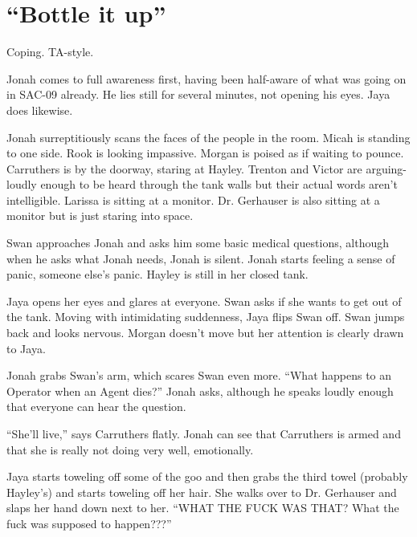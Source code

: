 \setcounter{chapter}{ 25 }
\chapter{\textbf{``Bottle it up''} }








Coping.  TA-style.




Jonah comes to full awareness first, having been half-aware of what was going on in SAC-09 already.  He lies still for several minutes, not opening his eyes.  Jaya does likewise.



Jonah surreptitiously scans the faces of the people in the room.  Micah is standing to one side.  Rook is looking impassive.  Morgan is poised as if waiting to pounce.  Carruthers is by the doorway, staring at Hayley.  Trenton and Victor are arguing- loudly enough to be heard through the tank walls but their actual words aren't intelligible.  Larissa is sitting at a monitor.  Dr. Gerhauser is also sitting at a monitor but is just staring into space.



Swan approaches Jonah and asks him some basic medical questions, although when he asks what Jonah needs, Jonah is silent.  Jonah starts feeling a sense of panic, someone else's panic.  Hayley is still in her closed tank.



Jaya opens her eyes and glares at everyone.  Swan asks if she wants to get out of the tank.  Moving with intimidating suddenness, Jaya flips Swan off.  Swan jumps back and looks nervous.  Morgan doesn't move but her attention is clearly drawn to Jaya.



Jonah grabs Swan's arm, which scares Swan even more.  ``What happens to an Operator when an Agent dies?'' Jonah asks, although he speaks loudly enough that everyone can hear the question.

``She'll live,'' says Carruthers flatly.   Jonah can see that Carruthers is armed and that she is really not doing very well, emotionally.



Jaya starts toweling off some of the goo and then grabs the third towel (probably Hayley's) and starts toweling off her hair.  She walks over to Dr. Gerhauser and slaps her hand down next to her.  ``WHAT THE FUCK WAS THAT?  What the fuck was supposed to happen???''

